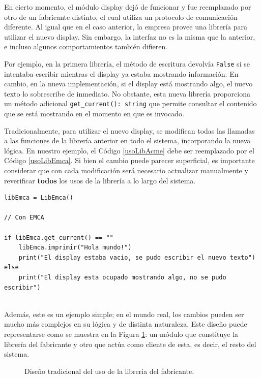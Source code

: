 En cierto momento, el módulo display dejó de funcionar y fue reemplazado por otro de un fabricante distinto, el cual utiliza un protocolo de comunicación diferente. Al igual que en el caso anterior, la empresa provee una librería \LibEmca para utilizar el nuevo display. Sin embargo, la interfaz no es la misma que la anterior, e incluso algunos comportamientos también difieren.

Por ejemplo, en la primera librería, el método de escritura devolvía \verb|False| si se intentaba escribir mientras el display ya estaba mostrando información. En cambio, en la nueva implementación, si el display está mostrando algo, el nuevo texto lo sobrescribe de inmediato. No obstante, esta nueva librería proporciona un método adicional \verb|get_current(): string| que permite consultar el contenido que se está mostrando en el momento en que es invocado.

Tradicionalmente, para utilizar el nuevo display, se modifican todas las llamadas a las funciones de la librería anterior en todo el sistema, incorporando la nueva lógica. En nuestro ejemplo, el Código \ref{usoLibAcme} debe ser reemplazado por el Código \ref{usoLibEmca}. Si bien el cambio puede parecer superficial, es importante considerar que con cada modificación será necesario actualizar manualmente y reverificar \textbf{todos} los usos de la librería a lo largo del sistema.
\begin{lstlisting}[label={usoLibEmca}, caption=Ejemplo de modificaciones necesarias para adaptar la nueva librería.]
libEmca = LibEmca()

// Con EMCA

if libEmca.get_current() == ""
	libEmca.imprimir("Hola mundo!")
	print("El display estaba vacio, se pudo escribir el nuevo texto")
else
	print("El display esta ocupado mostrando algo, no se pudo escribir")


\end{lstlisting}

Además, este es un ejemplo simple; en el mundo real, los cambios pueden ser mucho más complejos en su lógica y de distinta naturaleza. Este diseño puede representarse como se muestra en la Figura \ref{configOri}: un módulo que constituye la librería del fabricante y otro que actúa como cliente de esta, es decir, el resto del sistema.


\begin{figure}[H]
\caption{Diseño tradicional del uso de la libreria del fabricante.}
\label{configOri}
\begin{center}
\end{center}
\end{figure}


